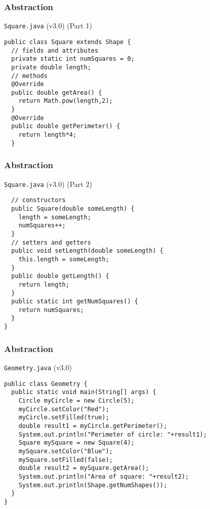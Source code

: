 \documentclass[10pt, compress]{beamer}
\begin{document}
\begin{frame}[fragile]
  \frametitle{Abstraction}
  \begin{block}{\texttt{Square.java} (v3.0) (Part 1)}
    \begin{verbatim}
public class Square extends Shape {
  // fields and attributes
  private static int numSquares = 0;
  private double length;
  // methods
  @Override
  public double getArea() {
    return Math.pow(length,2);
  }
  @Override
  public double getPerimeter() {
    return length*4;
  }
    \end{verbatim}
  \end{block}
\end{frame}

\begin{frame}[fragile]
  \frametitle{Abstraction}
  \begin{block}{\texttt{Square.java} (v3.0) (Part 2)}
    \begin{verbatim}
  // constructors
  public Square(double someLength) {
    length = someLength;
    numSquares++;
  }
  // setters and getters
  public void setLength(double someLength) {
    this.length = someLength;
  }
  public double getLength() {
    return length;
  }
  public static int getNumSquares() {
    return numSquares;
  }
}
    \end{verbatim}
  \end{block}
\end{frame}

\begin{frame}[fragile]
  \frametitle{Abstraction}
  \begin{block}{\texttt{Geometry.java} (v3.0)}
    \begin{verbatim}
public class Geometry {
  public static void main(String[] args) {
    Circle myCircle = new Circle(5);
    myCircle.setColor("Red");
    myCircle.setFilled(true);
    double result1 = myCircle.getPerimeter();
    System.out.println("Perimeter of circle: "+result1);
    Square mySquare = new Square(4);
    mySquare.setColor("Blue");
    mySquare.setFilled(false);
    double result2 = mySquare.getArea();
    System.out.println("Area of square: "+result2);
    System.out.println(Shape.getNumShapes());
  }
}
    \end{verbatim}
  \end{block}
\end{frame}

\end{document}
